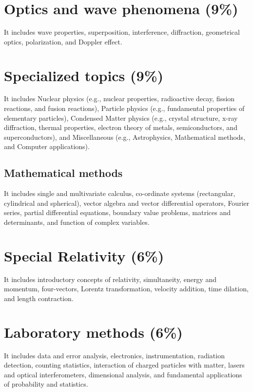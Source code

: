 \documentclass[12pt,a4paper]{article}
\begin{document}
\section{Optics and wave phenomena (9\%)}

It includes wave properties, superposition, interference, diffraction, geometrical optics, polarization, and Doppler effect.


\section{Specialized topics (9\%)}

It includes Nuclear physics (e.g., nuclear properties, radioactive decay, fission reactions, and fusion reactions), Particle physics (e.g., fundamental properties of elementary particles), Condensed Matter physics (e.g., crystal structure, x-ray diffraction, thermal properties, electron theory of metals, semiconductors, and superconductors), and Miscellaneous (e.g., Astrophysics, Mathematical methods, and Computer applications). 

\subsection{Mathematical methods}

It includes single and multivariate calculus, co-ordinate systems (rectangular, cylindrical and spherical), vector algebra and vector differential operators, Fourier series, partial differential equations, boundary value problems, matrices and determinants, and function of complex variables.


\section{Special Relativity (6\%)}

It includes introductory concepts of relativity, simultaneity, energy and momentum, four-vectors, Lorentz transformation, velocity addition, time dilation, and length contraction.

\section{Laboratory methods (6\%)}

It includes data and error analysis, electronics, instrumentation, radiation detection, counting statistics, interaction of charged particles with matter, lasers and optical interferometers, dimensional analysis, and fundamental applications of probability and statistics.
\end{document}
